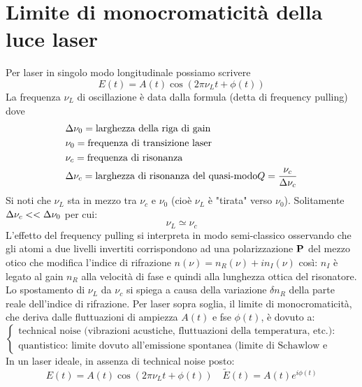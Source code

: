 \section{Limite di monocromaticità della luce laser}
Per laser in singolo modo longitudinale possiamo scrivere
\begin{equation*}
E(t) = A(t) \cos(2\pi \nu_L t + \phi(t))
\end{equation*}
La frequenza $\nu_L$ di oscillazione è data dalla formula (detta di frequency pulling) dove
\begin{align*}
&\Delta \nu_0 = \text{larghezza della riga di gain}\\
&\nu_0 = \text{frequenza di transizione laser}\\
&\nu_c = \text{frequenza di risonanza}\\
&\Delta\nu_c = \text{larghezza di risonanza del quasi-modo} Q = \frac{\nu_c}{\Delta\nu_c}
\end{align*}
Si noti che $\nu_L$ sta in mezzo tra $\nu_c$ e $\nu_0$ (cioè $\nu_L$ è "tirata" verso $\nu_0$). Solitamente $\Delta\nu_c << \Delta\nu_0$ per cui:
\begin{equation*}
\nu_L \simeq \nu_c
\end{equation*}
L'effetto del frequency pulling si interpreta in modo semi-classico osservando che gli atomi a due livelli invertiti corrispondono ad una polarizzazione $\mathbf{P}$ del mezzo otico che modifica l'indice di rifrazione $n(\nu) = n_R(\nu) + in_I(\nu)$ così:
$n_I$ è legato al gain $n_R$ alla velocità di fase e quindi alla lunghezza ottica del risonatore. Lo spostamento di $\nu_L$ da $\nu_c$ si spiega a causa della variazione $\delta n_R$ della parte reale dell'indice di rifrazione.
Per laser sopra soglia, il limite di monocromaticità, che deriva dalle fluttuazioni di ampiezza $A(t)$ e fse $\phi(t)$, è dovuto a:
\begin{equation*}
\begin{cases}
\text{technical noise (vibrazioni acustiche, fluttuazioni della temperatura, etc.): prevale in tutti i laser tranne che nei laser a semiconduttore}\\
\text{quantistico: limite dovuto all'emissione spontanea (limite di Schawlow e Townes) limitante nei laser a semiconduttore}
\end{cases}
\end{equation*}
In un laser ideale, in assenza di technical noise posto:
\begin{equation*}
E(t) = A(t) \cos(2\pi\nu_Lt + \phi(t)) \quad \tilde{E}(t) = A(t) e^{i\phi(t)}
\end{equation*}
